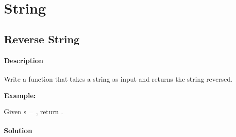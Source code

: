 \chapter{String}

\section{Reverse String} %

\subsubsection{Description}
Write a function that takes a string as input and returns the string reversed.

\textbf{Example:}

Given s = , return .

\subsubsection{Solution}

\begin{Code}

\end{Code}

\newpage
